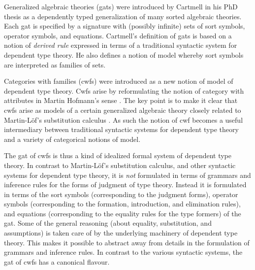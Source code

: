 \documentclass{lmcs}
\begin{document}
Generalized algebraic theories (gats) were introduced by Cartmell in his PhD thesis \cite{cartmell:phd} as a dependently typed generalization of many sorted algebraic theories. Each gat is specified by a signature with (possibly infinite) sets of sort symbols, operator symbols, and equations. Cartmell's definition of gats \cite{cartmell:phd,cartmell:apal} is based on a notion of {\em derived rule} expressed in terms of a traditional syntactic system for dependent type theory. He also defines a notion of model whereby sort symbols are interpreted as families of sets.

Categories with families (cwfs) \cite{dybjer:torino} were introduced as a new notion of model of dependent type theory. Cwfs arise by reformulating the notion of category with attributes in Martin Hofmann's sense \cite{hofmann:csl}. The key point is to make it clear that cwfs arise as models of a certain generalized algebraic theory closely related to Martin-Löf's substitution calculus \cite{martinlof:gbg92}. As such the notion of cwf becomes a useful intermediary between traditional syntactic systems for dependent type theory and a variety of categorical notions of model.

The gat of cwfs is thus a kind of idealized formal system of dependent type theory. In contrast to Martin-Löf's substitution calculus, and other syntactic systems for dependent type theory, it is {\em not} formulated in terms of grammars and inference rules for the forms of judgment of type theory. Instead it is formulated in terms of the sort symbols (corresponding to the judgment forms), operator symbols (corresponding to the formation, introduction, and elimination rules), and equations (corresponding to the equality rules for the type formers) of the gat. Some of the general reasoning (about equality, substitution, and assumptions) is taken care of by the underlying machinery of dependent type theory. This makes it possible to abstract away from details in the formulation of grammars and inference rules. In contrast to the various syntactic systems, the gat of cwfs has a canonical flavour. 
\end{document}
